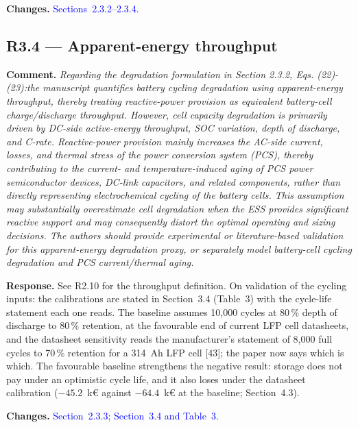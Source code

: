 \documentclass[11pt]{article}
\newcommand{\rcomment}[1]{\par\medskip\noindent\textbf{Comment.} \textit{#1}\par\smallskip}
\newcommand{\rresponse}[1]{\noindent\textbf{Response.} #1\par\smallskip}
\newcommand{\rchanges}[1]{\noindent\textbf{Changes.} \textcolor{blue}{#1}\par\medskip}
\begin{document}
\rchanges{Sections~2.3.2--2.3.4.}

\subsection*{R3.4 --- Apparent-energy throughput}
\rcomment{
Regarding the degradation formulation in Section 2.3.2, Eqs. (22)-(23):the manuscript quantifies battery cycling degradation using apparent-energy throughput, thereby treating reactive-power provision as equivalent battery-cell charge/discharge throughput. However, cell capacity degradation is primarily driven by DC-side active-energy throughput, SOC variation, depth of discharge, and C-rate. Reactive-power provision mainly increases the AC-side current, losses, and thermal stress of the power conversion system (PCS), thereby contributing to the current- and temperature-induced aging of PCS power semiconductor devices, DC-link capacitors, and related components, rather than directly representing electrochemical cycling of the battery cells. This assumption may substantially overestimate cell degradation when the ESS provides significant reactive support and may consequently distort the optimal operating and sizing decisions. The authors should provide experimental or literature-based validation for this apparent-energy degradation proxy, or separately model battery-cell cycling degradation and PCS current/thermal aging.
}
\rresponse{See R2.10 for the throughput definition. On validation of the cycling inputs: the calibrations are stated in Section~3.4 (Table~3) with the cycle-life statement each one reads. The baseline assumes 10,000 cycles at 80\,\% depth of discharge to 80\,\% retention, at the favourable end of current LFP cell datasheets, and the datasheet sensitivity reads the manufacturer's statement of 8,000 full cycles to 70\,\% retention for a 314~Ah LFP cell [43]; the paper now says which is which. The favourable baseline strengthens the negative result: storage does not pay under an optimistic cycle life, and it also loses under the datasheet calibration ($-45.2$~k\euro{} against $-64.4$~k\euro{} at the baseline; Section~4.3).}
\rchanges{Section~2.3.3; Section~3.4 and Table~3.}
\end{document}
